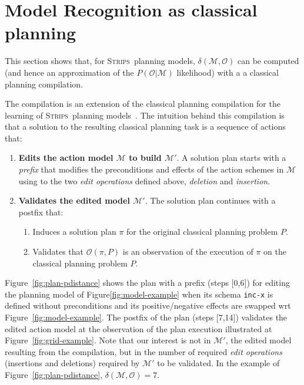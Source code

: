 \documentclass[letterpaper]{article} %
\newcommand{\strips}{\textsc{Strips}}     %
\begin{document}
\section{Model Recognition as classical planning}
This section shows that, for \strips\ planning models, $\delta(\mathcal{M},\mathcal{O})$ can be computed (and hence an approximation of the $P(\mathcal{O}|\mathcal{M})$ likelihood) with a a classical planning compilation.

The compilation is an extension of the classical planning compilation for the learning of \strips\ planning models~\cite{aineto2018learning}. The intuition behind this compilation is that a solution to the resulting classical planning task is a sequence of actions that:
\begin{enumerate}
\item {\bf Edits the action model $\mathcal{M}$ to build $\mathcal{M}'$}. A solution plan starts with a {\em prefix} that modifies the preconditions and effects of the action schemes in $\mathcal{M}$ using to the two {\em edit operations} defined above, {\em deletion} and {\em insertion}. 
\item {\bf Validates the edited model $\mathcal{M}'$}. The solution plan continues with a postfix that:
\begin{enumerate}
\item Induces a solution plan $\pi$ for the original classical planning problem $P$.
\item Validates that $\mathcal{O}(\pi,P)$ is an observation of the execution of $\pi$ on the classical planning problem $P$.
\end{enumerate}
\end{enumerate}

Figure~\ref{fig:plan-pdistance} shows the plan with a prefix (steps [0,6]) for editing the planning model of Figure\ref{fig:model-example} when its schema {\tt\small inc-x} is defined without preconditions and its positive/negative effects are swapped wrt Figure~\ref{fig:model-example}. The postfix of the plan (steps [7,14]) validates the edited action model at the observation of the plan execution illustrated at Figure~\ref{fig:grid-example}. Note that our interest is not in $\mathcal{M}'$, the edited model resulting from the compilation, but in the number of required {\em edit operations} (insertions and deletions) required by $\mathcal{M}'$ to be validated. In the example of Figure~\ref{fig:plan-pdistance}, $\delta(\mathcal{M},\mathcal{O})=7$.
\end{document}
